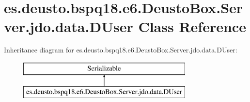 \hypertarget{classes_1_1deusto_1_1bspq18_1_1e6_1_1_deusto_box_1_1_server_1_1jdo_1_1data_1_1_d_user}{}\section{es.\+deusto.\+bspq18.\+e6.\+Deusto\+Box.\+Server.\+jdo.\+data.\+D\+User Class Reference}
\label{classes_1_1deusto_1_1bspq18_1_1e6_1_1_deusto_box_1_1_server_1_1jdo_1_1data_1_1_d_user}
Inheritance diagram for es.\+deusto.\+bspq18.\+e6.\+Deusto\+Box.\+Server.\+jdo.\+data.\+D\+User\+:\begin{figure}[H]
\begin{center}
\leavevmode
\includegraphics[height=2.000000cm]{classes_1_1deusto_1_1bspq18_1_1e6_1_1_deusto_box_1_1_server_1_1jdo_1_1data_1_1_d_user}
\end{center}
\end{figure}

